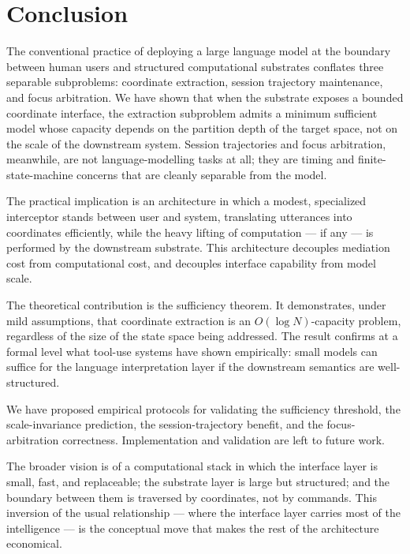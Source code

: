 \documentclass[11pt,twocolumn,a4paper]{article}
\theoremstyle{definition}
\theoremstyle{remark}
\begin{document}
\section{Conclusion}
\label{sec:conclusion}

The conventional practice of deploying a large language model at the boundary between human users and structured computational substrates conflates three separable subproblems: coordinate extraction, session trajectory maintenance, and focus arbitration. We have shown that when the substrate exposes a bounded coordinate interface, the extraction subproblem admits a minimum sufficient model whose capacity depends on the partition depth of the target space, not on the scale of the downstream system. Session trajectories and focus arbitration, meanwhile, are not language-modelling tasks at all; they are timing and finite-state-machine concerns that are cleanly separable from the model.

The practical implication is an architecture in which a modest, specialized interceptor stands between user and system, translating utterances into coordinates efficiently, while the heavy lifting of computation --- if any --- is performed by the downstream substrate. This architecture decouples mediation cost from computational cost, and decouples interface capability from model scale.

The theoretical contribution is the sufficiency theorem. It demonstrates, under mild assumptions, that coordinate extraction is an $O(\log N)$-capacity problem, regardless of the size of the state space being addressed. The result confirms at a formal level what tool-use systems have shown empirically: small models can suffice for the language interpretation layer if the downstream semantics are well-structured.

We have proposed empirical protocols for validating the sufficiency threshold, the scale-invariance prediction, the session-trajectory benefit, and the focus-arbitration correctness. Implementation and validation are left to future work.

The broader vision is of a computational stack in which the interface layer is small, fast, and replaceable; the substrate layer is large but structured; and the boundary between them is traversed by coordinates, not by commands. This inversion of the usual relationship --- where the interface layer carries most of the intelligence --- is the conceptual move that makes the rest of the architecture economical.



\end{document}
